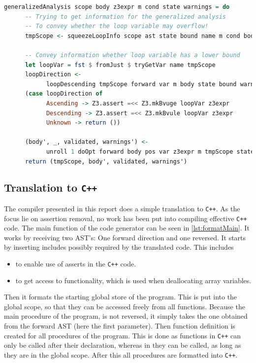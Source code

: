 \begin{lstlisting}[language=Haskell, label={lst:generalizeLoopOpt},
      caption={Optimizing the loop based on generalized information.}]
generalizedAnalysis scope body z3expr m cond state warnings = do
      -- Trying to get information for the generalized analysis
      -- To convey whether the loop variable may overflow!
      tmpScope <- squeezeLoopInfo scope ast state bound name m cond body forward

      -- Convey information whether loop variable has a lower bound
      let loopVar = fst $ fromJust $ tryGetVar name tmpScope
      loopDirection <-
            loopDescending tmpScope forward var m body state bound warnings
      (case loopDirection of
            Ascending -> Z3.assert =<< Z3.mkBvuge loopVar z3expr
            Descending -> Z3.assert =<< Z3.mkBvule loopVar z3expr
            Unknown -> return ())

      (body', _, validated, warnings') <-
            unroll 1 doOpt forward body pos var z3expr m tmpScope state warnings
      return (tmpScope, body', validated, warnings')
\end{lstlisting}

\subsection{Translation to \texttt{C++} }
The \lan compiler presented in this report does a simple translation to \texttt{C++}.
As the focus lie on assertion removal, no work has been put into compiling effective
\texttt{C++} code. The main function of the code generator can be seen in
\autoref{lst:formatMain}. It works by receiving two AST's: One forward direction and one reversed.
It starts by inserting includes possibly required by the translated code. This includes

\begin{itemize}
      \item {} to enable use of asserts in the \texttt{C++} code.

      \item {} to get access to  functionality, which is used
            when deallocating array variables.
\end{itemize}
\noindent
Then it formats the starting global store of the \lan program. This is put into the global
scope, so that they can be accessed freely from all functions. Because the main procedure of
the \lan program, is not reversed, it simply takes the one obtained from the forward AST
(here the first parameter).
Then function definition is created for all procedures of the program. This is done as
functions in \texttt{C++} can only be called after their declaration, whereas in \lan
they can be called, as long as they are in the global scope.
After this all procedures are formatted into \texttt{C++}.

